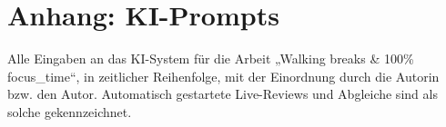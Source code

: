 \section*{Anhang: KI-Prompts}

Alle Eingaben an das KI-System für die Arbeit „Walking breaks \& 100\% focus\_time“, in zeitlicher Reihenfolge, mit der Einordnung durch die Autorin bzw. den Autor. Automatisch gestartete Live-Reviews und Abgleiche sind als solche gekennzeichnet.

\begin{enumerate}
\end{enumerate}

